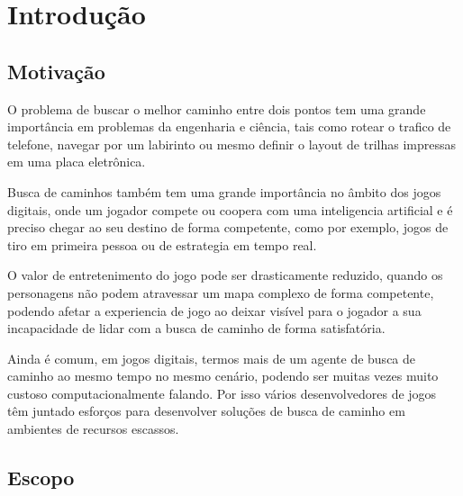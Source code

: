
\chapter[Introdução]{Introdução}

\section{Motivação}

O problema de buscar o melhor caminho entre dois pontos tem uma grande importância em problemas da engenharia e ciência, tais como rotear o trafico de telefone, navegar por um labirinto ou mesmo definir o layout de trilhas impressas em uma placa eletrônica.

Busca de caminhos também tem uma grande importância no âmbito dos jogos digitais, onde um jogador compete ou coopera com uma inteligencia artificial e é preciso chegar ao seu destino de forma competente, como por exemplo, jogos de tiro em primeira pessoa ou de estrategia em tempo real.

O valor de entretenimento do jogo pode ser drasticamente reduzido, quando os personagens não podem atravessar um mapa complexo de forma competente, podendo afetar a experiencia de jogo ao deixar visível para o jogador a sua incapacidade de lidar com a busca de caminho de forma satisfatória.

Ainda é comum, em jogos digitais, termos mais de um agente de busca de caminho ao mesmo tempo no mesmo cenário, podendo ser muitas vezes muito custoso computacionalmente falando. Por isso vários desenvolvedores de jogos têm juntado esforços para desenvolver soluções de busca de caminho em ambientes de recursos escassos. \cite{Pontevia}

   


	


\section{Escopo}



